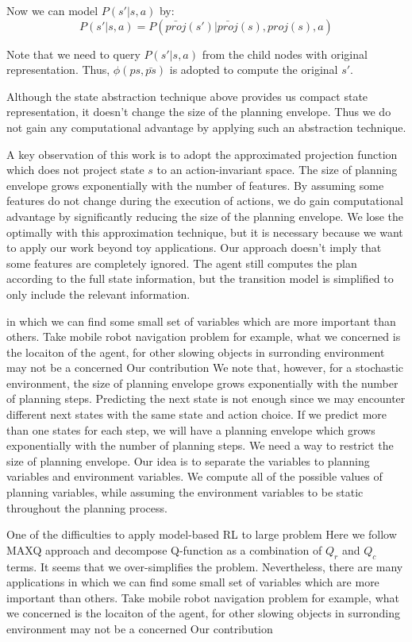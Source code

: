 Now we can model $P(s'|s, a)$ by:
\begin{equation}
    P(s'|s, a) = P(\bar{proj}(s')| \bar{proj}(s), proj(s), a)
\end{equation}

Note that we need to query $P(s'|s, a)$ from the child nodes with original representation.
Thus, $\phi(ps, \bar{ps})$ is adopted to compute the original $s'$.  

Although the state abstraction technique above provides us compact state representation, 
it doesn't change the size of the planning envelope. Thus we do not gain any computational
advantage by applying such an abstraction technique.

A key observation of this work is to adopt the approximated projection function which
does not project state $s$ to an action-invariant space.
The size of planning envelope grows exponentially with the number of features.
By assuming 
some features do not change during the execution of actions, we do gain computational advantage by
significantly reducing the size of the planning envelope. 
We lose the optimally with this approximation technique, but it is necessary because we want 
to apply our work beyond toy applications.
Our approach doesn't imply that
some features are completely ignored. The agent still computes the plan according to 
the full state information, but the transition model is simplified to only include the 
relevant information.

in which we can find some small set of variables which are more important than others. Take 
mobile robot navigation problem for example, 
what we concerned is the locaiton of the agent, 
for other slowing objects in surronding environment may not be a concerned 
Our contribution
We note that, however, for a stochastic environment, the size of planning envelope grows exponentially with the number of planning
steps. Predicting the next state is not enough since we may encounter different next states with the same state and action choice.
If we predict more than one states for each step, we will have a planning envelope which grows exponentially with the number of planning
steps. We need a way to restrict the size of planning envelope. Our idea is to separate the variables to planning variables 
and environment variables. We compute all of the possible values of planning variables, while assuming 
the environment variables to be static throughout the planning process.  

One of the difficulties to apply model-based RL to large problem 
Here we follow MAXQ approach and decompose Q-function as a combination of $Q_r$ and $Q_c$ terms.
It seems that we over-simplifies the problem. Nevertheless, there are many applications
in which we can find some small set of variables which are more important than others. Take 
mobile robot navigation problem for example, 
what we concerned is the locaiton of the agent, 
for other slowing objects in surronding environment may not be a concerned 
Our contribution



